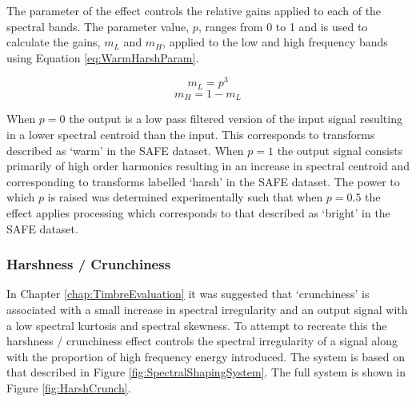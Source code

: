 			The parameter of the effect controls the relative gains applied to each of the spectral bands. The
			parameter value, $p$, ranges from 0 to 1 and is used to calculate the gains, $m_{L}$ and $m_{H}$,
			applied to the low and high frequency bands using Equation \ref{eq:WarmHarshParam}.

			\[ m_{L} = p^{3} \]
			\begin{equation}
				m_{H} = 1 - m_{L}
				\label{eq:WarmHarshParam}
			\end{equation}

			When $p = 0$  the output is a low pass filtered version of the input signal resulting in a lower
			spectral centroid than the input. This corresponds to transforms  described as `warm' in the SAFE
			dataset. When $p = 1$ the output signal consists primarily of high order harmonics resulting in an
			increase in spectral centroid and corresponding to transforms labelled `harsh' in the SAFE dataset.
			The power to which $p$ is raised was determined experimentally such that when $p = 0.5$ the effect
			applies processing which corresponds to that described as `bright' in the SAFE dataset. 

		\subsubsection*{Harshness / Crunchiness}
			In Chapter \ref{chap:TimbreEvaluation} it was suggested that `crunchiness' is associated with a
			small increase in spectral irregularity and an output signal with a low spectral kurtosis and
			spectral skewness. To attempt to recreate this the harshness / crunchiness effect controls the
			spectral irregularity of a signal along with the proportion of high frequency energy introduced. The
			system is based on that described in Figure \ref{fig:SpectralShapingSystem}. The full system is
			shown in Figure \ref{fig:HarshCrunch}.

